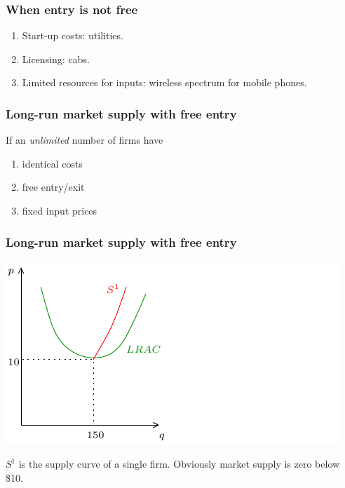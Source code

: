 \documentclass[xcolor=pdftex,dvipsnames]{beamer}
\begin{document}
\begin{frame}
\frametitle{When entry is not free}
\begin{enumerate}[<+->]
\item Start-up costs: utilities.
\item Licensing: cabs.
\item Limited resources for inputs: wireless spectrum  for mobile phones.

\end{enumerate}
\end{frame}








\begin{frame}
\frametitle{Long-run market supply with free entry}
If an \emph{unlimited} number of firms have
\begin{enumerate}[<+->]
\item identical costs
\item free entry/exit
\item fixed input prices
\end{enumerate}

\end{frame}








\begin{frame}
\frametitle{Long-run market supply with free entry}
\begin{center}
\includegraphics{pics/LRMS1}
\end{center}
$S^1$ is the supply curve of a single firm. Obviously market supply is
zero below \$10.
\end{frame}
\end{document}
